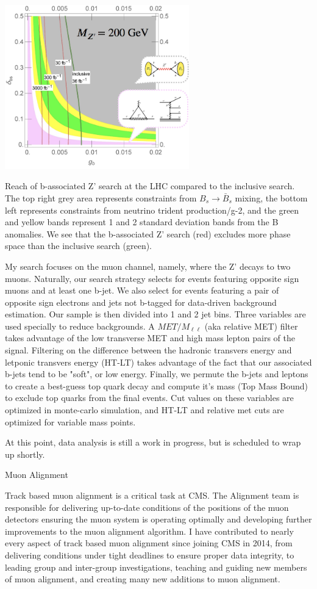 \documentclass[11pt]{article}
\begin{document}
\includegraphics[width=8cm]{images/excluded_phase_space.png}
\caption{Reach of b-associated Z' search at the LHC compared to the inclusive search. The top right grey area represents constraints from $B_s\rightarrow \bar{B}_s$ mixing, the bottom left represents constraints from neutrino trident production/g-2, and the green and yellow bands represent 1 and 2 standard deviation bands from the B anomalies. We see that the b-associated Z' search (red) excludes more phase space than the inclusive search (green).}

My search focuses on the muon channel, namely, where the Z' decays to two muons. Naturally, our search strategy selects for events featuring opposite sign muons and at least one b-jet. We also select for events featuring a pair of opposite sign electrons and jets not b-tagged for data-driven background estimation. Our sample is then divided into 1 and 2 jet bins. Three variables are used specially to reduce backgrounds. A $MET/M_{\ell\ell}$ (aka relative MET) filter takes advantage of the low transverse MET and high mass lepton pairs of the signal. Filtering on the difference between the hadronic transvers energy and letponic transvers energy (HT-LT) takes advantage of the fact that our associated b-jets tend to be "soft", or low energy. Finally, we permute the b-jets and leptons to create a best-guess top quark decay and compute it's mass (Top Mass Bound) to exclude top quarks from the final events. Cut values on these variables are optimized in monte-carlo simulation, and HT-LT and relative met cuts are optimized for variable mass points. 

At this point, data analysis is still a work in progress, but is scheduled to wrap up shortly. 

Muon Alignment

 Track based muon alignment is a critical task at CMS. The Alignment team is responsible for delivering up-to-date conditions of the positions of the muon detectors ensuring the muon system is operating optimally and developing further improvements to the muon alignment algorithm. I have contributed to nearly every aspect of track based muon alignment since joining CMS in 2014, from delivering conditions under tight deadlines to ensure proper data integrity, to leading group and inter-group investigations, teaching and guiding new members of muon alignment, and creating many new additions to muon alignment. 
 
\end{document}
